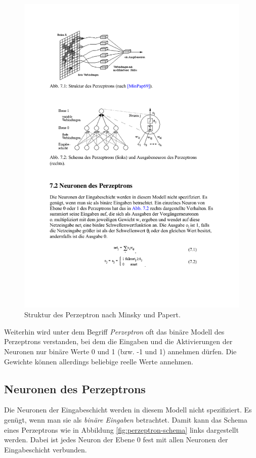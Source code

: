 \begin{figure}[ht!] \centering 
	\includegraphics[width=\linewidth]{figures/ch02_perzeptron-minsky-papert.pdf}
	\caption{Struktur des Perzeptron nach Minsky und Papert.}
	\label{fig:perzeptron-minsky-papert}
\end{figure}

Weiterhin wird unter dem Begriff \emph{Perzeptron} oft das binäre Modell des Perzeptrons verstanden, bei dem die Eingaben und die Aktivierungen der Neuronen nur binäre Werte 0 und 1 (bzw. -1 und 1) annehmen dürfen. Die Gewichte können allerdings beliebige reelle Werte annehmen.

\subsection*{Neuronen des Perzeptrons}
Die Neuronen der Eingabeschicht werden in diesem Modell nicht spezifiziert. Es genügt, wenn man sie als \emph{binäre Eingaben} betrachtet.
Damit kann das Schema eines Perzeptrons wie in Abbildung \ref{fig:perzeptron-schema} links dargestellt werden. Dabei ist jedes Neuron der Ebene 0 fest mit allen Neuronen der Eingabeschicht verbunden.

